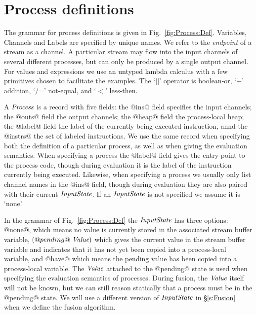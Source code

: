 
\clearpage{}
\section{Process definitions}



The grammar for process definitions is given in Fig.~\ref{fig:Process:Def}. Variables, Channels and Labels are specified by unique names. We refer to the \emph{endpoint} of a stream as a channel. A particular stream may flow into the input channels of several different processes, but can only be produced by a single output channel. For values and expressions we use an untyped lambda calculus with a few primitives chosen to facilitate the examples. The `$||$' operator is boolean-or, `+' addition, `/=' not-equal, and `$<$' less-then.

A $\textit{Process}$ is a record with five fields: the @ins@ field specifies the input channels; the @outs@ field the output channels; the @heap@ field the process-local heap; the @label@ field the label of the currently being executed instruction, annd the @instrs@ the set of labeled instructions. We use the same record when specifying both the definition of a particular process, as well as when giving the evaluation semantics. When specifying a process the @label@ field gives the entry-point to the process code, though during evaluation it is the label of the instruction currently being executed. Likewise, when specifying a process we usually only list channel names in the @ins@ field, though during evaluation they are also paired with their current $\textit{InputState}$. If an $\textit{InputState}$ is not specified we assume it is `none'.

In the grammar of Fig.~\ref{fig:Process:Def} the $\textit{InputState}$ has three options: @none@, which means no value is currently stored in the associated stream buffer variable, $(@pending@~\textit{Value})$ which gives the current value in the stream buffer variable and indicates that it has not yet been copied into a process-local variable, and @have@ which means the pending value has been copied into a process-local variable. The $\textit{Value}$ attached to the @pending@ state is used when specifying the evaluation semantics of processes. During fusion, the $\textit{Value}$ itself will not be known, but we can still reason statically that a process must be in the @pending@ state. We will use a different version of $\textit{InputState}$ in \S\ref{s:Fusion} when we define the fusion algorithm.


